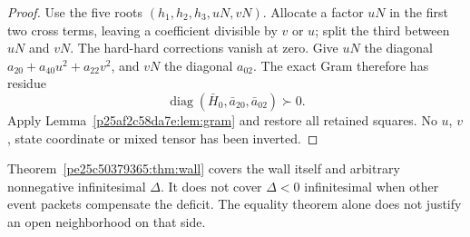 \begin{proof}
Use the five roots $(h_1,h_2,h_3,uN,vN)$. Allocate a factor $uN$ in the first two cross terms, leaving a coefficient divisible by $v$ or $u$; split the third between $uN$ and $vN$. The hard-hard corrections vanish at zero. Give $uN$ the diagonal $a_{20}+a_{40}u^2+a_{22}v^2$, and $vN$ the diagonal $a_{02}$. The exact Gram therefore has residue
\[
\operatorname{diag}(\bar H_0,\bar a_{20},\bar a_{02})\succ0.
\]
Apply Lemma~\ref{p25af2c58da7e:lem:gram} and restore all retained squares. No $u$, $v$, state coordinate or mixed tensor has been inverted.
\end{proof}

Theorem~\ref{pe25c50379365:thm:wall} covers the wall itself and arbitrary nonnegative infinitesimal $\Delta$. It does not cover $\Delta<0$ infinitesimal when other event packets compensate the deficit. The equality theorem alone does not justify an open neighborhood on that side.
